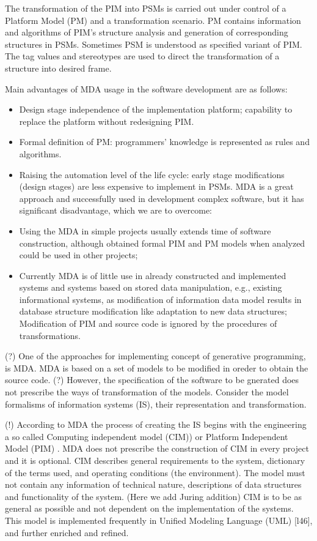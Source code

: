 \documentclass{intech}
\begin{document}
The transformation of the PIM into PSMs is carried out under control of a Platform Model (PM) and a transformation scenario. PM contains information and algorithms of PIM’s structure analysis and generation of corresponding structures in PSMs. Sometimes PSM is understood as specified variant of PIM. The tag values and stereotypes are used to direct the transformation of a structure into desired frame.

Main advantages of MDA usage in the software development are as follows:
\begin{itemize}
\item Design stage independence of the implementation platform; capability to replace the platform without redesigning PIM.

\item Formal definition of PM: programmers’ knowledge is
represented as rules and algorithms.

\item Raising the automation level of the life cycle: early stage modifications (design stages) are less expensive to implement in PSMs. MDA is a great approach and successfully used in development complex software, but it has significant disadvantage, which we are to overcome:

\item Using the MDA in simple projects usually extends time of software construction, although obtained formal PIM and PM models when analyzed could be used in other projects;

\item Currently MDA is of little use in already constructed and implemented systems and systems based on stored data manipulation, e.g., existing informational systems, as modification of information data model results in database structure modification like adaptation to new data structures; Modification of PIM and source code is ignored by the procedures of transformations.
\end{itemize}

(?) One of the approaches for implementing concept of generative  programming, is MDA. MDA is based on a set of models to be modified in oreder to obtain the source code. (?) However, the specification of the software to be gnerated does not prescribe the ways of transformation of the models. Consider the model formalisms of information systems (IS), their representation and transformation.

(!) According to MDA the process of creating the IS begins with the engineering a so called Computing independent model (CIM)) or Platform Independent Model (PIM) \cite{b115}. MDA does not prescribe the construction of CIM in every project and it is optional. CIM describes general requirements to the system, dictionary of the terms used, and operating conditions (the environment). The model must not contain any information of technical nature, descriptions of data structures and functionality of the system. (Here we add Juring addition)  CIM is to be as general as possible and not dependent on the implementation of the systems. This model is implemented frequently in Unified Modeling Language (UML) [l46], and further enriched and refined.
\end{document}
